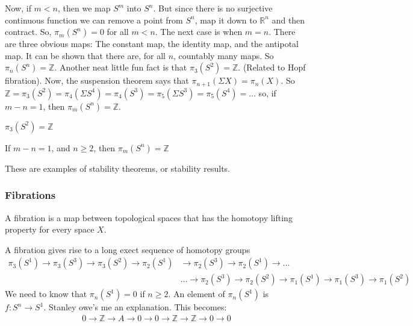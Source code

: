 \documentclass[crop=false,class=book,oneside]{standalone}                      %
\begin{document}
            Now, if $m<n$, then we map $S^{m}$ into $S^{n}$. But since there is no surjective continuous function we can remove a point from $S^{n}$, map it down to $\mathbb{R}^{n}$ and then contract. So, $\pi_{m}(S^{n})=0$ for all $m<n$. The next case is when $m=n$. There are three obvious maps: The constant map, the identity map, and the antipotal map. It can be shown that there are, for all $n$, countably many maps. So $\pi_{n}(S^{n})=\mathbb{Z}$. Another neat little fun fact is that $\pi_{3}(S^{2})=\mathbb{Z}$. (Related to Hopf fibration). Now, the suspension theorem says that $\pi_{n+1}(\Sigma X)=\pi_{n}(X)$. So $\mathbb{Z}=\pi_{3}(S^{2})=\pi_{4}(\Sigma S^4)=\pi_{4}(S^{3})=\pi_{5}(\Sigma S^{3})=\pi_{5}(S^{4})=\hdots$ so, if $m-n=1$, then $\pi_{m}(S^{n})=\mathbb{Z}$.
            \begin{theorem}
            $\pi_{3}(S^{2})=\mathbb{Z}$
            \end{theorem}
            \begin{theorem}
            If $m-n=1$, and $n\geq 2$, then $\pi_{m}(S^{n})=\mathbb{Z}$
            \end{theorem}
            These are examples of stability theorems, or stability results.
            \subsubsection{Fibrations}
            \begin{definition}
            A fibration is a map between topological spaces that has the homotopy lifting property for every space $X$.
            \end{definition}
            A fibration gives rise to a long exect sequence of homotopy groups
            \begin{align*}
                \pi_{3}(S^{1})\rightarrow\pi_{3}(S^{3})\rightarrow\pi_{3}(S^{2})\rightarrow\pi_{2}(S^{1})&\rightarrow\pi_{2}(S^{3})\rightarrow\pi_{2}(S^{1})\rightarrow\hdots\\
                &\hdots\rightarrow\pi_{2}(S^{3})\rightarrow\pi_{2}(S^{2})\rightarrow\pi_{1}(S^{1})\rightarrow\pi_{1}(S^{3})\rightarrow\pi_{1}(S^{2})
            \end{align*}
            We need to know that $\pi_{n}(S^{1})=0$ if $n\geq 2$. An element of $\pi_{n}(S^{1})$ is $f:S^{n}\rightarrow S^{1}$. Stanley owe's me an explanation.
            This becomes:
            \begin{align*}
                0\rightarrow\mathbb{Z}\rightarrow A\rightarrow 0\rightarrow 0\rightarrow\mathbb{Z}\rightarrow\mathbb{Z}\rightarrow 0\rightarrow 0
            \end{align*}
\end{document}
